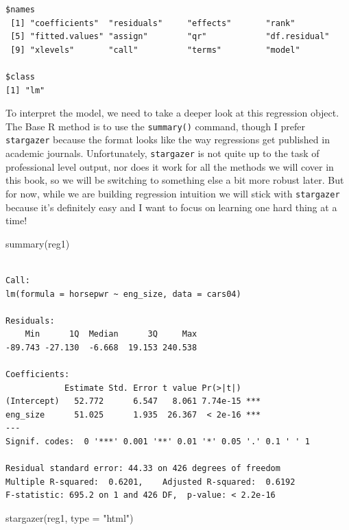 \documentclass[
  letterpaper,
]{book}
\newenvironment{Shaded}{\begin{snugshade}}{\end{snugshade}}
\newcommand{\AttributeTok}[1]{\textcolor[rgb]{0.40,0.45,0.13}{#1}}
\newcommand{\FunctionTok}[1]{\textcolor[rgb]{0.28,0.35,0.67}{#1}}
\newcommand{\NormalTok}[1]{\textcolor[rgb]{0.00,0.23,0.31}{#1}}
\newcommand{\StringTok}[1]{\textcolor[rgb]{0.13,0.47,0.30}{#1}}
\begin{document}
\begin{verbatim}
$names
 [1] "coefficients"  "residuals"     "effects"       "rank"         
 [5] "fitted.values" "assign"        "qr"            "df.residual"  
 [9] "xlevels"       "call"          "terms"         "model"        

$class
[1] "lm"
\end{verbatim}

To interpret the model, we need to take a deeper look at this regression
object. The Base R method is to use the \texttt{summary()} command,
though I prefer \texttt{stargazer} because the format looks like the way
regressions get published in academic journals. Unfortunately,
\texttt{stargazer} is not quite up to the task of professional level
output, nor does it work for all the methods we will cover in this book,
so we will be switching to something else a bit more robust later. But
for now, while we are building regression intuition we will stick with
\texttt{stargazer} because it's definitely easy and I want to focus on
learning one hard thing at a time!

\begin{Shaded}
\begin{Highlighting}[]
\FunctionTok{summary}\NormalTok{(reg1)}
\end{Highlighting}
\end{Shaded}

\begin{verbatim}

Call:
lm(formula = horsepwr ~ eng_size, data = cars04)

Residuals:
    Min      1Q  Median      3Q     Max 
-89.743 -27.130  -6.668  19.153 240.538 

Coefficients:
            Estimate Std. Error t value Pr(>|t|)    
(Intercept)   52.772      6.547   8.061 7.74e-15 ***
eng_size      51.025      1.935  26.367  < 2e-16 ***
---
Signif. codes:  0 '***' 0.001 '**' 0.01 '*' 0.05 '.' 0.1 ' ' 1

Residual standard error: 44.33 on 426 degrees of freedom
Multiple R-squared:  0.6201,    Adjusted R-squared:  0.6192 
F-statistic: 695.2 on 1 and 426 DF,  p-value: < 2.2e-16
\end{verbatim}

\begin{Shaded}
\begin{Highlighting}[]
\FunctionTok{stargazer}\NormalTok{(reg1, }\AttributeTok{type =} \StringTok{"html"}\NormalTok{)}
\end{Highlighting}
\end{Shaded}
\end{document}
